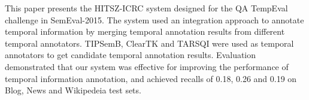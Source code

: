 This paper presents the HITSZ-ICRC system designed for the QA TempEval challenge in SemEval-2015. The system used an integration approach to annotate temporal information by merging temporal annotation results from different temporal annotators. TIPSemB, ClearTK and TARSQI were used as temporal annotators to get candidate temporal annotation results. Evaluation demonstrated that our system was effective for improving the performance of temporal information annotation, and achieved recalls of 0.18, 0.26 and 0.19 on Blog, News and Wikipedeia test sets.
